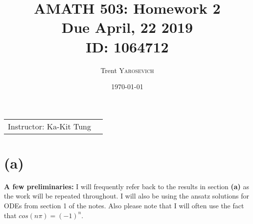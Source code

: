 \documentclass{article}
\title{AMATH 503: Homework 2 \\Due April, 22 2019 \\ ID: 1064712} %
\author{Trent \textsc{Yarosevich}} %
\date{\today} %
\begin{document}
\maketitle %
\setlength\parindent{1cm}

\begin{center}
\begin{tabular}{l r}
Instructor: Ka-Kit Tung %
\end{tabular}
\end{center}
\doublespacing

\section*{\textbf{(a)}}
\textbf{A few preliminaries:} I will frequently refer back to the results in section \textbf{(a)} as the work will be repeated throughout. I will also be using the ansatz solutions for ODEs from section 1 of the notes. Also please note that I will often use the fact that $cos(n\pi) = (-1)^n$.\\
\\
\end{document}
